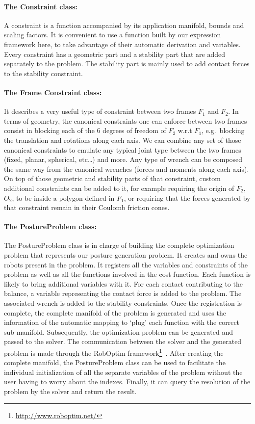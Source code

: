 \paragraph{The Constraint class:}
A constraint is a function accompanied by its application manifold, bounds and scaling factors.
It is convenient to use a function built by our expression framework here, to take advantage of their automatic derivation and variables.
Every constraint has a geometric part and a stability part that are added separately to the problem.
The stability part is mainly used to add contact forces to the stability constraint.

\paragraph{The Frame Constraint class:}
It describes a very useful type of constraint between two frames $F_1$ and $F_2$.
In terms of geometry, the canonical constraints one can enforce between two frames consist in blocking each of the 6 degrees of freedom of $F_2$ w.r.t $F_1$, e.g.\ blocking the translation and rotations along each axis.
We can combine any set of those canonical constraints to emulate any typical joint type between the two frames (fixed, planar, spherical, etc\ldots) and more.
Any type of wrench can be composed the same way from the canonical wrenches (forces and moments along each axis).
On top of those geometric and stability parts of that constraint, custom additional constraints can be added to it, for example requiring the origin of $F_2$, $O_2$, to be inside a polygon defined in $F_1$, or requiring that the forces generated by that constraint remain in their Coulomb friction cones.

\paragraph{The PostureProblem class:}
The PostureProblem class is in charge of building the complete optimization problem that represents our posture generation problem.
It creates and owns the robots present in the problem.
It registers all the variables and constraints of the problem as well as all the functions involved in the cost function.
Each function is likely to bring additional variables with it.
For each contact contributing to the balance, a variable representing the contact force is added to the problem.
The associated wrench is added to the stability constraints.
Once the registration is complete, the complete manifold of the problem is generated and uses the information of the automatic mapping to `plug' each function with the correct sub-manifold.
Subsequently, the optimization problem can be generated and passed to the solver.
The communication between the solver and the generated problem is made through the RobOptim framework\footnote{\url{http://www.roboptim.net/}}~\cite{moulard:jsme:2013, moulard:jrsj:2014}.
After creating the complete manifold, the PostureProblem class can be used to facilitate the individual initialization of all the separate variables of the problem without the user having to worry about the indexes.
Finally, it can query the resolution of the problem by the solver and return the result.


